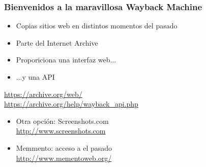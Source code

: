 \begin{frame}
\frametitle{Bienvenidos a la maravillosa Wayback Machine}

{\Large
\begin{itemize}
\item Copias sitios web en distintos momentos del pasado
\item Parte del Internet Archive
\item Proporiciona una interfaz web...
\item ...y una API
\end{itemize}

\begin{flushright}
\url{https://archive.org/web/} \\
\url{https://archive.org/help/wayback_api.php} \\
\end{flushright}

\begin{itemize}
\item Otra opción: Screenshots.com \\
  \url{http://www.screenshots.com} \\
\item Memmento: acceso a el pasado \\
  \url{http://www.mementoweb.org/} \\
\end{itemize}
}


\end{frame}


